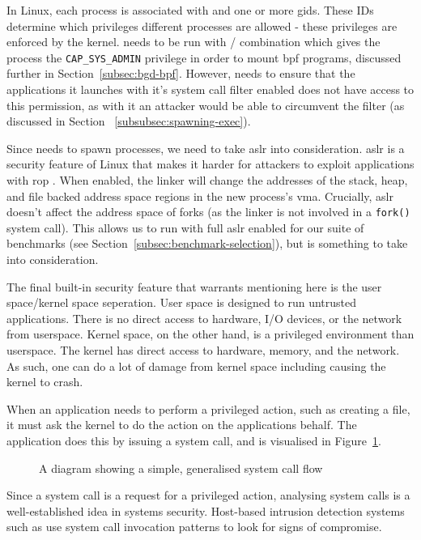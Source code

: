In Linux, each process is associated with  and one or more \acp{gid}.
These IDs determine which privileges different processes are allowed - these
privileges are enforced by the kernel. \af needs to be run with
/ combination which gives the process the
\texttt{CAP\_SYS\_ADMIN} privilege in order to mount \ac{bpf} programs,
discussed further in Section~\ref{subsec:bgd-bpf}. However, \af needs to ensure
that the applications it launches with it's system call filter enabled does not
have access to this permission, as with it an attacker would be able to
circumvent the filter (as discussed in Section ~\ref{subsubsec:spawning-exec}).

Since \af needs to spawn processes, we need to take \ac{aslr} into
consideration. \ac{aslr} is a security feature of Linux that makes it harder for
attackers to exploit applications with \ac{rop} \cite{ASLR_GUARD}. When
enabled, the linker will change the addresses of the stack, heap, and file
backed address space regions in the new process's \ac{vma}. Crucially, \ac{aslr}
doesn't affect the address space of forks (as the linker is not involved in
a \texttt{fork()} system call). This allows us to run \af with full \ac{aslr}
enabled for our suite of benchmarks (see 
Section~\ref{subsec:benchmark-selection}), but is something to take into
consideration.  

The final built-in security feature that warrants mentioning here is the user
space/kernel space seperation. User space is designed to run untrusted 
applications. There is no direct access to hardware, I/O devices, or the 
network from userspace. Kernel space, on the other hand, is a privileged 
environment than userspace. The kernel has direct access to hardware, memory, and the
network. As such, one can do a lot of damage from kernel space including causing
the kernel to crash.

When an application needs to perform a privileged action, such as creating a
file, it must ask the kernel to do the action on the applications behalf. The
application does this by issuing a system call, and is visualised in
Figure~\ref{fig:syscall-flow}.

\begin{figure}[h]
\centering
{}
\caption{A diagram showing a simple, generalised system call
flow}\label{fig:syscall-flow}
\end{figure}

Since a system call is a request for a privileged action, analysing system calls
is a well-established idea in systems security. Host-based intrusion detection
systems such as \cite{10.1145/3214304} use system call invocation patterns to look for
signs of compromise.

